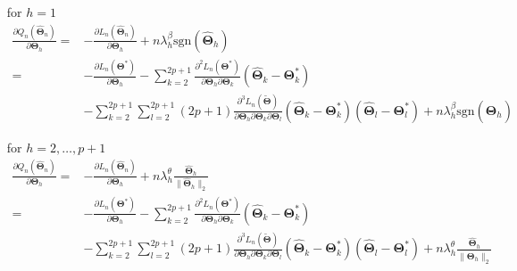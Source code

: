 \documentclass[12pt,letter]{article}\usepackage[]{graphicx}\usepackage[]{color}
\newcommand{\bTheta}{\boldsymbol{\Theta}}
\begin{document}
\begin{itemize}
	\item[for] $h=1$  
\begin{align*}
	\frac{\partial Q_{n}\left(\widehat{\boldsymbol{\Theta}}_{n}\right)}{\partial\bTheta_{h}}= & -\frac{\partial L_{n}\left(\widehat{\boldsymbol{\Theta}}_{n}\right)}{\partial\bTheta_{h}}+n\lambda_{h}^{\beta}\textrm{sgn}\left(\widehat{\bTheta}_{h}\right)\\
	= & -\frac{\partial L_{n}\left(\boldsymbol{\Theta}^{*}\right)}{\partial\bTheta_{h}}-\sum_{k=2}^{2p+1}\frac{\partial^{2}L_{n}\left(\boldsymbol{\Theta}^{*}\right)}{\partial\bTheta_{h}\partial\bTheta_{k}}\left(\widehat{\bTheta}_{k}-\bTheta_{k}^{*}\right)\\
	& -\sum_{k=2}^{2p+1}\sum_{l=2}^{2p+1}  (2p+1)\frac{\partial^{3}L_{n}(\widetilde{\bTheta})}{\partial\bTheta_{h}\partial\bTheta_{k}\partial\bTheta_{l}}\left(\widehat{\bTheta}_{k}-\bTheta_{k}^{*}\right)\left(\widehat{\bTheta}_{l}-\bTheta_{l}^{*}\right)+n\lambda_{h}^{\beta}\textrm{sgn}\left(\widehat{\bTheta}_{h}\right)
\end{align*} 
\item[for] $h=2, \ldots, p+1$ 
\begin{align*}
\frac{\partial Q_{n}\left(\widehat{\boldsymbol{\Theta}}_{n}\right)}{\partial\bTheta_{h}}= & -\frac{\partial L_{n}\left(\widehat{\boldsymbol{\Theta}}_{n}\right)}{\partial\bTheta_{h}}+n\lambda_{h}^{\theta}\frac{\widehat{\bTheta}_{h}}{\|\widehat{\bTheta}_{h} \|_2}\\
= & -\frac{\partial L_{n}\left(\boldsymbol{\Theta}^{*}\right)}{\partial\bTheta_{h}}-\sum_{k=2}^{2p+1}\frac{\partial^{2}L_{n}\left(\boldsymbol{\Theta}^{*}\right)}{\partial\bTheta_{h}\partial\bTheta_{k}}\left(\widehat{\bTheta}_{k}-\bTheta_{k}^{*}\right)\\
& -\sum_{k=2}^{2p+1}\sum_{l=2}^{2p+1}  (2p+1)\frac{\partial^{3}L_{n}(\widetilde{\bTheta})}{\partial\bTheta_{h}\partial\bTheta_{k}\partial\bTheta_{l}}\left(\widehat{\bTheta}_{k}-\bTheta_{k}^{*}\right)\left(\widehat{\bTheta}_{l}-\bTheta_{l}^{*}\right)+n\lambda_{h}^{\theta}\frac{\widehat{\bTheta}_{h}}{\|\widehat{\bTheta}_{h} \|_2}
\end{align*} 
\end{itemize}
\end{document}
